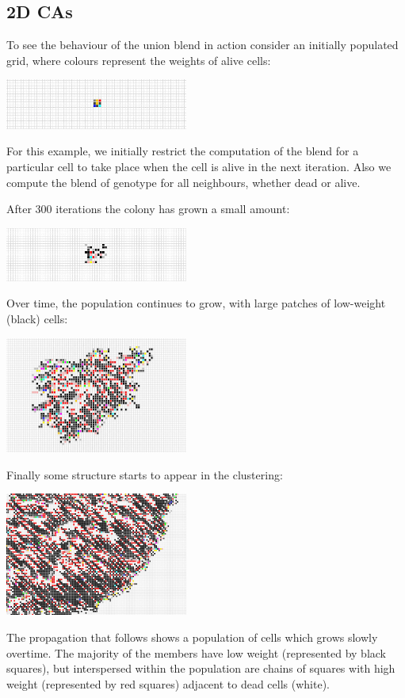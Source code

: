 \documentclass{AISB2008}
\begin{document}
\subsection{2D CAs} \label{2d-results}

To see the behaviour of the union blend in action consider an
initially populated grid, where colours represent the weights of alive
cells:
 \begin{center}
 \includegraphics[width=0.45\textwidth]{initial2d.jpg}
 \end{center}
For this example, we initially restrict the computation of the blend for a particular cell to take place when the cell is alive in the next iteration. Also we compute the blend of genotype for all neighbours, whether dead or alive.

After 300 iterations the colony has grown a small amount:
 \begin{center}
 \includegraphics[width=0.45\textwidth]{3002d.jpg}
 \end{center}
Over time, the population continues to grow, with large patches of low-weight (black) cells:
 \begin{center}
 \includegraphics[width=0.45\textwidth]{30002d.jpg}
 \end{center}
Finally some structure starts to appear in the clustering:
 \begin{center}
 \includegraphics[width=0.45\textwidth]{300002d.jpg}
 \end{center}
The propagation that follows shows a population of cells which grows
slowly overtime. The majority of the members have low weight
(represented by black squares), but interspersed within the population
are chains of squares with high weight (represented by red squares)
adjacent to dead cells (white).
\end{document}
